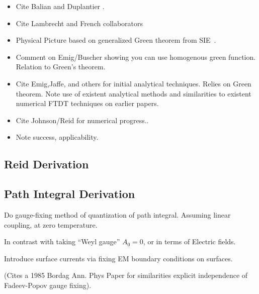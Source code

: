 \begin{itemize}
\item Cite Balian and Duplantier \cite{Balian1977, Balian1978}.
\item Cite Lambrecht and French collaborators
  \cite{Lambrecht2006, MaiaNeto2008,Canaguier-Durand2012}
\item Physical Picture based on generalized Green theorem from 
  SIE~\cite{Stratton1941}.
\item Comment on Emig/Buscher showing you can use homogenous green function.
  Relation to Green's theorem.
\item Cite Emig,Jaffe,  and others for initial analytical techniques.  Relies on Green theorem.
\cite{Emig2004, Emig2007, Rahi2009}
\cite{Kenneth2006}
  Note use of existent analytical methods and similarities to existent 
  numerical FTDT techniques on earlier papers.  
  \cite{Rodriguez2007,Rodriguez2007a, Rodriguez2009}
\item Cite Johnson/Reid for numerical progress.\cite{Reid2009,Reid2011, Reid2013}.
\item Note success, applicability.  
\end{itemize}

\subsection{Reid Derivation}
\subsection{Path Integral Derivation}

Do gauge-fixing method of quantization of path integral.
Assuming linear coupling, at zero temperature.  

In contrast with taking ``Weyl gauge'' $A_0=0$, or in terms of Electric fields.    

Introduce surface currents via fixing EM boundary conditions on surfaces.  

(Cites a 1985 Bordag Ann. Phys Paper for similarities explicit independence of Fadeev-Popov
gauge fixing).

